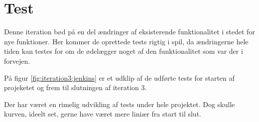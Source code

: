 \section{Test}

Denne iteration bød på en del ændringer af eksisterende funktionalitet i stedet for nye funktioner. Her kommer de oprettede tests rigtig i spil, da ændringerne hele tiden kan testes for om de ødelægger noget af den funktionalitet som var der i forvejen.

På figur \ref{fig:iteration3:jenkins} er et udklip af de udførte tests for starten af projeketet og frem til slutningen af iteration 3.


Der har været en rimelig udvikling af tests under hele projektet. Dog skulle kurven, ideelt set, gerne have været mere liniær fra start til slut.